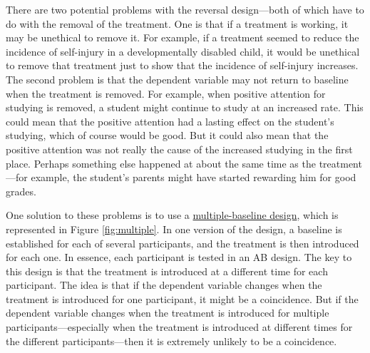 \documentclass[
]{krantz}
\begin{document}
There are two potential problems with the reversal design---both of which have to do with the removal of the treatment. One is that if a treatment is working, it may be unethical to remove it. For example, if a treatment seemed to reduce the incidence of self-injury in a developmentally disabled child, it would be unethical to remove that treatment just to show that the incidence of self-injury increases. The second problem is that the dependent variable may not return to baseline when the treatment is removed. For example, when positive attention for studying is removed, a student might continue to study at an increased rate. This could mean that the positive attention had a lasting effect on the student's studying, which of course would be good. But it could also mean that the positive attention was not really the cause of the increased studying in the first place. Perhaps something else happened at about the same time as the treatment---for example, the student's parents might have started rewarding him for good grades.

One solution to these problems is to use a \protect\hyperlink{multiple-baseline-design}{multiple-baseline design}, which is represented in Figure \ref{fig:multiple}. In one version of the design, a baseline is established for each of several participants, and the treatment is then introduced for each one. In essence, each participant is tested in an AB design. The key to this design is that the treatment is introduced at a different time for each participant. The idea is that if the dependent variable changes when the treatment is introduced for one participant, it might be a coincidence. But if the dependent variable changes when the treatment is introduced for multiple participants---especially when the treatment is introduced at different times for the different participants---then it is extremely unlikely to be a coincidence.
\end{document}
